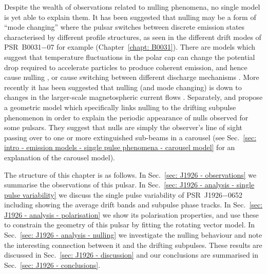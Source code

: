 Despite the wealth of observations related to nulling phenomena, no single model is yet able to explain them. It has been suggested that nulling may be a form of ``mode changing'' where the pulsar switches between discrete emission states characterised by different profile structures, as seen in the different drift modes of PSR~B0031$-$07 for example (Chapter~\ref{chapt: B0031}). There are models which suggest that temperature fluctuations in the polar cap can change the potential drop required to accelerate particles to produce coherent emission, and hence cause nulling \citep{Cxxx1981, DCHR1986}, or cause switching between different discharge mechanisms \citep{DHxx1986, ZQLH1997, ZQHx1997}. More recently it has been suggested that nulling (and mode changing) is down to changes in the larger-scale magnetospheric current flows \citep{WMJx2007,LHK+2010,Txxx2010b}. Separately, \citet{HRxx2007,HRxx2009} and \citet{RWxx2008} propose a geometric model which specifically links nulling to the drifting subpulse phenomenon in order to explain the periodic appearance of nulls observed for some pulsars. They suggest that nulls are simply the observer's line of sight passing over to one or more extinguished sub-beams in a carousel (see Sec.~\ref{sec: intro - emission models - single pulse phenomena - carousel model} for an explanation of the carousel model).


The structure of this chapter is as follows. In Sec.~\ref{sec: J1926 - observations} we summarise the observations of this pulsar. In Sec.~\ref{sec: J1926 - analysis - single pulse variability} we discuss the single pulse variability of PSR~J1926$-$0652 including showing the average drift bands and subpulse phase tracks. In Sec.~\ref{sec: J1926 - analysis - polarisation} we show its polarisation properties, and use these to constrain the geometry of this pulsar by fitting the rotating vector model. In Sec.~\ref{sec: J1926 - analysis - nulling} we investigate the nulling behaviour and note the interesting connection between it and the drifting subpulses. These results are discussed in Sec.~\ref{sec: J1926 - discussion} and our conclusions are summarised in Sec.~\ref{sec: J1926 - conclusions}.

